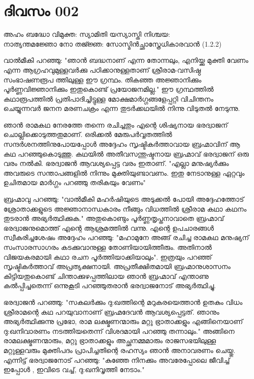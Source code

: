 \section{ദിവസം 002}

\begin{center}
 അഹം ബദ്ധോ വിമുക്ത: സ്യാമിതി യസ്യാസ്തി നിശ്ചയ:\\
നാത്യന്തമജ്ഞോ നോ തജ്ജ്ഞ: സോസ്മിൻച്ഛാസ്ത്രേധികാരവാൻ (1.2.2)\\
\end{center}

വാല്‍മീകി പറഞ്ഞു: "ഞാന്‍ ബദ്ധനാണ്‌ എന്ന തോന്നലും, എനിയ്ക്കു മുക്തി വേണം എന്ന  ആഗ്രഹവുമുള്ളവര്‍ക്കു  പഠിക്കാനുള്ളതാണ്‌ ശ്രീരാമ-വസിഷ്ഠ  സംഭാഷണരൂപ ത്തിലുള്ള  ഈ ഗ്രന്ഥം. തികഞ്ഞ അജ്ഞാനിക്കും പൂര്‍ണ്ണവിജ്ഞാനിക്കും ഇതുകൊണ്ട്‌ പ്രയോജനമില്ല."  ഈ ഗ്രന്ഥത്തില്‍ കഥാരൂപത്തില്‍ പ്രതിപാദിച്ചിട്ടുള്ള മോക്ഷമാര്‍ഗ്ഗങ്ങളേപ്പറ്റി വിചിന്തനം ചെയ്യുന്നവര്‍ ജനന മരണചക്രം എന്ന തുടര്‍ക്കഥയില്‍ നിന്നു വിടുതല്‍ നേടുന്നു.

ഞാന്‍ രാമകഥ നേരത്തേ തന്നെ രചിച്ചതും എന്റെ ശിഷ്യനായ ഭരദ്വാജന്‌ ചൊല്ലിക്കൊടുത്തതുമാണ്‌. ഒരിക്കല്‍ മേരുപര്‍വ്വതത്തില്‍ സന്ദര്‍ശനത്തിനുപോയപ്പോള്‍ അദ്ദേഹം സൃഷ്ടികര്‍ത്താവായ ബ്രഹ്മാവിന്‌ ആ കഥ പറഞ്ഞുകൊടുത്തു. കഥയില്‍ അതീവസന്തുഷ്ടനായ ബ്രഹ്മാവ്‌ ഭരദ്വാജന്‌ ഒരു വരം നല്‍കി. ഭരദ്വാജന്‍ ആവശ്യപ്പെട്ട വരം ഇതാണ്‌. "എല്ലാ മനുഷ്യര്‍ക്കും അവരുടെ സന്താപങ്ങളില്‍ നിന്നും മുക്തിയുണ്ടാവണം. ഇതു നേടാനുള്ള ഏറ്റവും ഉചിതമായ മാര്‍ഗ്ഗം പറഞ്ഞു തരികയും വേണം"

ബ്രഹ്മാവു പറഞ്ഞു: "വാല്‍മീകി മഹര്‍ഷിയുടെ അടുക്കല്‍ പോയി അദ്ദേഹത്തോട്‌ ശ്രോതാക്കളുടെ അജ്ഞാനാന്ധകാരം നീങ്ങും വിധത്തില്‍ ശ്രീരാമ കഥാ കഥനം തുടരാന്‍ അഭ്യര്‍ത്ഥിക്കുക." അതുകൊണ്ടും പൂര്‍ണ്ണതൃപ്തനാവാതെ ബ്രഹ്മാവ്‌ ഭരദ്വാജനുമൊത്ത്‌ എന്റെ ആശ്രമത്തില്‍ വന്നു. എന്റെ ഉപചാരങ്ങള്‍ സ്വീകരിച്ചശേഷം അദ്ദേഹം പറഞ്ഞു: "മഹാമുനേ അങ്ങ്‌ രചിച്ച രാമകഥ മനുഷ്യന്‌ സംസാരസാഗരം കടക്കുവാനുള്ള തോണിയായിത്തീരും. അതിനാല്‍ വിജയകരമായി കഥാ രചന പൂര്‍ത്തിയാക്കിയാലും". ഇത്രയും പറഞ്ഞ്‌ സൃഷ്ടികര്‍ത്താവ്‌ അപ്രത്യക്ഷനായി. അപ്രതീക്ഷിതമായി ബ്രഹ്മാനുശാസനം കിട്ടിയതുകൊണ്ട്‌ ചിന്താക്കുഴപ്പത്തിലായ ഞാന്‍ ബ്രഹ്മാവ്‌ എന്താണു കല്‍പ്പിച്ചതെന്ന് ഒന്നുകൂടി പറഞ്ഞുതരാന്‍ ഭരദ്വാജനോട്‌ അഭ്യര്‍ത്ഥിച്ചു. 

ഭരദ്വാജന്‍ പറഞ്ഞു: "സകലര്‍ക്കും ദു:ഖത്തിന്റെ മറുകരയെത്താന്‍ ഉതകും വിധം ശ്രീരാമന്റെ കഥ പറയുവാനാണ്‌ ബ്രഹ്മദേവന്‍ ആവശ്യപ്പെട്ടത്‌. ഞാനും അഭ്യര്‍ത്ഥിക്കുന്നു പ്രഭോ, രാമ ലക്ഷ്മണന്മാരും മറ്റു ഭ്രാതാക്കളും എങ്ങിനെയാണ്‌ ദു:ഖനിവാരണം നടത്തിയതെന്ന് വിശദമായി പറഞ്ഞു തന്നാലും."  അങ്ങിനെ രാമലക്ഷ്മണന്മാരും, മറ്റു ഭ്രാതാക്കളും അച്ഛനമ്മമാരും രാജസഭയിലുള്ള മറ്റുള്ളവരും മുക്തിപദം പ്രാപിച്ചതിന്റെ രഹസ്യം ഞാന്‍ അനാവരണം ചെയ്തു. എന്നിട്ട്‌ ഭരദ്വാജനോട്‌ പറഞ്ഞു: "കുഞ്ഞേ നിനക്കും അവരേപ്പോലെ ജീവിച്ച്‌ ഇപ്പോള്‍ , ഇവിടെ വച്ച്‌, ദു:ഖനിവൃത്തി നേടാം." 
